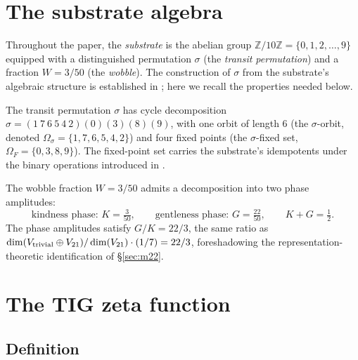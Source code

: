 \documentclass[11pt,reqno]{amsart}
\theoremstyle{plain}
\theoremstyle{definition}
\theoremstyle{remark}
\newcommand{\Vtriv}{V_{\rm trivial}}
\newcommand{\Vtwentyone}{V_{21}}
\begin{document}
\section{The substrate algebra}\label{sec:substrate}


Throughout the paper, the \emph{substrate} is the abelian group
$\mathbb{Z}/10\mathbb{Z} = \{0, 1, 2, \ldots, 9\}$ equipped with a
distinguished permutation $\sigma$ (the \emph{transit permutation})
and a fraction $W = 3/50$ (the \emph{wobble}). The construction of
$\sigma$ from the substrate's algebraic structure is established in
\cite{SandersGishSigma}; here we recall the properties needed below.

The transit permutation $\sigma$ has cycle decomposition $\sigma = (1\
7\ 6\ 5\ 4\ 2)(0)(3)(8)(9)$, with one orbit of length $6$ (the
$\sigma$-orbit, denoted $\Omega_\sigma = \{1, 7, 6, 5, 4, 2\}$) and
four fixed points (the $\sigma$-fixed set, $\Omega_F = \{0, 3, 8, 9\}$).
The fixed-point set carries the substrate's idempotents under the
binary operations introduced in \cite{SandersGishFourCore}.

The wobble fraction $W = 3/50$ admits a decomposition into two phase
amplitudes:
\begin{equation}\label{eq:wobble-phases}
\text{kindness phase: } K = \tfrac{3}{50}, \qquad
\text{gentleness phase: } G = \tfrac{22}{50}, \qquad K + G = \tfrac{1}{2}.
\end{equation}
The phase amplitudes satisfy $G/K = 22/3$, the same ratio as
$\dim(\Vtriv \oplus \Vtwentyone)/\dim(\Vtwentyone) \cdot (1/7) = 22/3$,
foreshadowing the representation-theoretic identification of
\S\ref{sec:m22}.


\section{The TIG zeta function}\label{sec:zeta}


\subsection{Definition}
\end{document}
